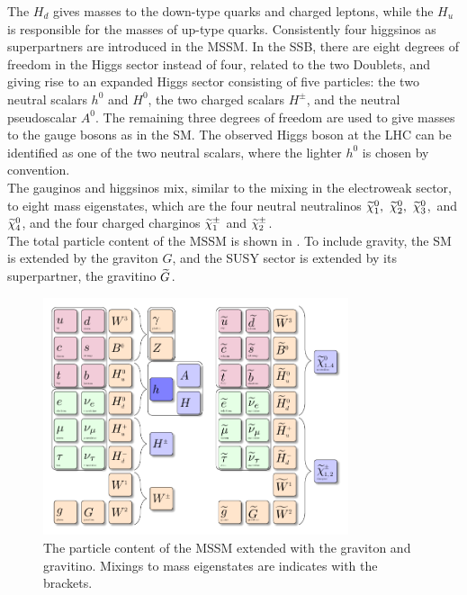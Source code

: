 The $H_d$ gives masses to the down-type quarks and charged leptons, while the $H_u$ is responsible for the masses of up-type quarks. Consistently four higgsinos as superpartners are introduced in the MSSM. In the SSB, there are eight degrees of freedom in the Higgs sector instead of four, related to the two Doublets, and giving rise to an expanded Higgs sector consisting of five particles: the two neutral scalars $h^0$ and $H^0$, the two charged scalars $H^{\pm}$, and the neutral pseudoscalar $A^0$. The remaining three degrees of freedom are used to give masses to the gauge bosons as in the SM. The observed Higgs boson at the LHC can be identified as one of the two neutral scalars, where the lighter $h^0$ is chosen by convention.\\
The gauginos and higgsinos mix, similar to the mixing in the electroweak sector, to eight mass eigenstates, which are the four neutral neutralinos $\widetilde{\chi}^{0}_{1},~\widetilde{\chi}^{0}_{2},~\widetilde{\chi}^{0}_{3}$,~and $\widetilde{\chi}^{0}_{4}$, and the four charged charginos $\widetilde{\chi}^\pm_{1}$ and $\widetilde{\chi}^{\pm}_{2}$.\\
The total particle content of the MSSM is shown in . To include gravity, the SM is extended by the graviton $G$, and the SUSY sector is extended by its superpartner, the gravitino $\widetilde{G}$.

\begin{figure}[tbp]
 \centering
 \includegraphics[width=0.8\textwidth]{figures/general/MSSM}
 \caption{The particle content of the MSSM extended with the graviton and gravitino. Mixings to mass eigenstates are indicates with the brackets.}
 \label{fig:mssm}
\end{figure}

